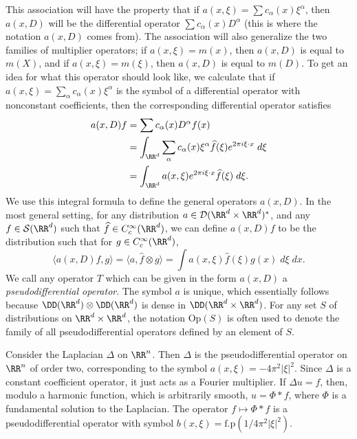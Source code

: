 This association will have the property that if $a(x,\xi) = \sum c_\alpha(x) \xi^\alpha$, then $a(x,D)$ will be the differential operator $\sum c_\alpha(x) D^\alpha$ (this is where the notation $a(x,D)$ comes from). The association will also generalize the two families of multiplier operators; if $a(x,\xi) = m(x)$, then $a(x,D)$ is equal to $m(X)$, and if $a(x,\xi) = m(\xi)$, then $a(x,D)$ is equal to $m(D)$. To get an idea for what this operator should look like, we calculate that if $a(x,\xi) = \sum_\alpha c_\alpha(x) \xi^\alpha$ is the symbol of a differential operator with nonconstant coefficients, then the corresponding differential operator satisfies
%
\begin{align*}
    a(x,D) f &= \sum c_\alpha(x) D^\alpha f(x)\\
    &= \int_{\RR^d} \sum_\alpha c_\alpha(x) \xi^\alpha \widehat{f}(\xi) e^{2 \pi i \xi \cdot x}\; d\xi\\
    &= \int_{\RR^d} a(x,\xi) e^{2 \pi i \xi \cdot x} \widehat{f}(\xi)\; d\xi.
\end{align*}
%
We use this integral formula to define the general operators $a(x,D)$. In the most general setting, for any distribution $a \in \mathcal{D}(\RR^d \times \RR^d)^*$, and any $f \in \mathcal{S}(\RR^d)$ such that $\widehat{f} \in C_c^\infty(\RR^d)$, we can define $a(x,D) f$ to be the distribution such that for $g \in C_c^\infty(\RR^d)$,
%
\[ \langle a(x,D) f, g \rangle = \langle a, \widehat{f} \otimes g \rangle = \int a(x,\xi) \widehat{f}(\xi) g(x)\; d\xi\; dx. \]
%
We call any operator $T$ which can be given in the form $a(x,D)$ a \emph{pseudodifferential operator}. The symbol $a$ is unique, which essentially follows because $\DD(\RR^d) \otimes \DD(\RR^d)$ is dense in $\DD(\RR^d \times \RR^d)$. For any set $S$ of distributions on $\RR^d \times \RR^d$, the notation $\text{Op}(S)$ is often used to denote the family of all pseudodifferential operators defined by an element of $S$.

\begin{example}
    Consider the Laplacian $\Delta$ on $\RR^n$. Then $\Delta$ is the pseudodifferential operator on $\RR^n$ of order two, corresponding to the symbol $a(x,\xi) = - 4\pi^2 |\xi|^2$. Since $\Delta$ is a constant coefficient operator, it just acts as a Fourier multiplier. If $\Delta u = f$, then, modulo a harmonic function, which is arbitrarily smooth, $u = \Phi * f$, where $\Phi$ is a fundamental solution to the Laplacian. The operator $f \mapsto \Phi * f$ is a pseudodifferential operator with symbol $b(x,\xi) = \text{f.p}(1/4\pi^2 |\xi|^2)$. 
\end{example}

